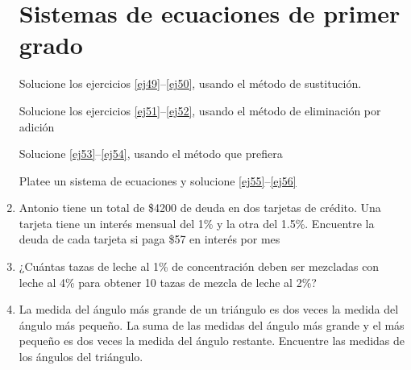 \documentclass[letterpaper,twoside]{article}
\begin{document}
\begin{multicols}{2}
\begin{enumerate}
\section*{Sistemas de ecuaciones de primer grado}
Solucione los ejercicios \ref{ej49}--\ref{ej50}, usando el método de sustitución.
Solucione los ejercicios \ref{ej51}--\ref{ej52}, usando el método de eliminación por adición
Solucione \ref{ej53}--\ref{ej54}, usando el método que prefiera
Platee un sistema de ecuaciones y solucione \ref{ej55}--\ref{ej56}
\item \label{ej55} Antonio tiene un total de \$4200 de deuda en dos tarjetas de crédito. Una tarjeta tiene un interés mensual del 1\% y la otra del 1.5\%. Encuentre la deuda de cada tarjeta si paga \$57 en interés por mes
\item ¿Cuántas tazas de leche al 1\% de concentración deben ser mezcladas con leche al 4\% para obtener 10 tazas de mezcla de leche al 2\%?
\item \label{ej56} La medida del ángulo más grande de un triángulo es dos veces la medida del ángulo más pequeño. La suma de las medidas del ángulo más grande y el más pequeño es dos veces la medida del ángulo restante. Encuentre las medidas de los ángulos del triángulo.
\end{enumerate}
\end{multicols}
\end{document}
